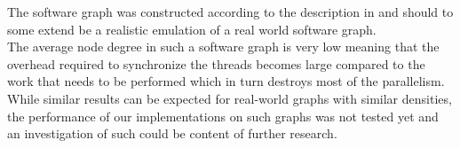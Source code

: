 %
The software graph was constructed according to the description in \cite{musco2014generative} and should to some extend be a realistic emulation of a real world software graph. \\
The average node degree in such a software graph is very low meaning that the overhead required to synchronize the threads becomes large compared to the work that needs to be performed which in turn destroys most of the parallelism. \\
%
While similar results can be expected for real-world graphs with similar densities, the performance of our implementations on such graphs was not tested yet and an investigation of such could be content of further research.
